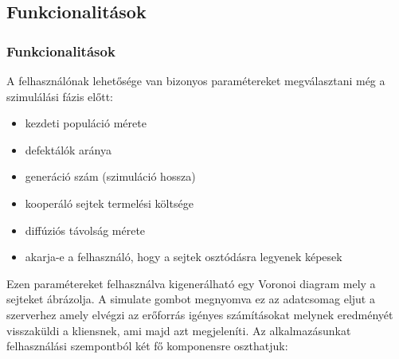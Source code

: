 \subsection{Funkcionalitások}
\begin{frame}
\frametitle{Funkcionalitások}
A felhasználónak lehetősége van bizonyos paramétereket megválasztani még a szimulálási fázis előtt:
\begin{itemize}
	\item kezdeti populáció mérete
	\item defektálók aránya 
	\item generáció szám (szimuláció hossza)
	\item kooperáló sejtek termelési költsége 
	\item diffúziós távolság mérete
	\item akarja-e a felhasználó, hogy a sejtek osztódásra legyenek képesek
\end{itemize}
Ezen paramétereket felhasználva kigenerálható egy Voronoi diagram mely a sejteket ábrázolja. A simulate gombot megnyomva ez az adatcsomag eljut a szerverhez amely elvégzi az erőforrás igényes számításokat melynek eredményét visszaküldi a kliensnek, ami majd azt megjeleníti.
Az alkalmazásunkat felhasználási szempontból két fő komponensre oszthatjuk:



\end{frame}

